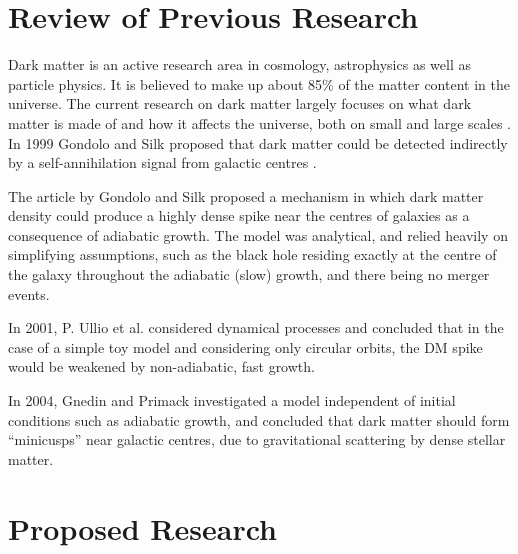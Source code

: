\documentclass[a4paper,10pt]{article}
\begin{document}
\section{Review of Previous Research}


Dark matter is an active research area in cosmology, astrophysics as well as particle physics. It is believed to make up about 85\% of the matter content in the universe. The current research on dark matter largely focuses on what dark matter is made of and how it affects the universe, both on small and large scales \citep{this_probably_doesnt_need_a_citation}. In 1999 Gondolo and Silk proposed that dark matter could be detected indirectly by a self-annihilation signal from galactic centres \citep{GS_1999_original}. %

The article by Gondolo and Silk proposed a mechanism in which dark matter density could produce a highly dense spike near the centres of galaxies as a consequence of adiabatic growth. The model was analytical, and relied heavily on simplifying assumptions, such as the black hole residing exactly at the centre of the galaxy throughout the adiabatic (slow) growth, and there being no merger events. %

In 2001, P. Ullio et al. considered dynamical processes and concluded that in the case of a simple toy model and considering 
only circular orbits, the DM spike would be weakened by non-adiabatic, fast growth.

In 2004, Gnedin and Primack investigated a model independent of initial conditions such as adiabatic growth, and concluded that 
dark matter should form ``minicusps'' near galactic centres, due to gravitational scattering by dense stellar matter. 




\section{Proposed Research}

\end{document}
